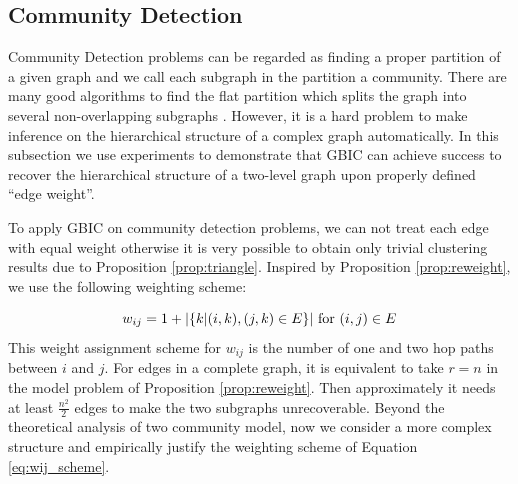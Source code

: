 \subsection{Community Detection}\label{subsec:cd}
Community Detection problems can be regarded as finding a proper partition of a given graph and we call each subgraph in the partition a community. There are many good algorithms
to find the flat partition which splits the graph into several non-overlapping subgraphs \citep{malliaros2013clustering}. However, it is a hard problem to make inference on the hierarchical structure of a complex graph automatically.
In this subsection we use experiments to demonstrate that GBIC
can achieve success to recover the hierarchical structure of a two-level graph upon properly defined ``edge weight''.

To apply GBIC on community detection problems, we can not treat each edge with equal weight otherwise it is very possible to obtain only trivial clustering results due to Proposition \ref{prop:triangle}. Inspired by Proposition \ref{prop:reweight}, we use the following weighting scheme:

\begin{equation}\label{eq:wij_scheme}
    w_{ij} = 1 + \lvert\{k | (i,k),(j,k) \in E \}\rvert \textrm{ for } (i,j) \in E
\end{equation}
This weight assignment scheme for $w_{ij}$ is the number of one and two hop paths between $i$ and $j$. For edges in a complete graph, it is equivalent to take $r=n$ in the model problem of Proposition \ref{prop:reweight}. Then approximately it needs
at least $\frac{n^2}{2}$ edges to make the two subgraphs unrecoverable.
Beyond the theoretical analysis of two community model, now we consider a more complex structure and empirically justify the weighting scheme of Equation 
\eqref{eq:wij_scheme}.

